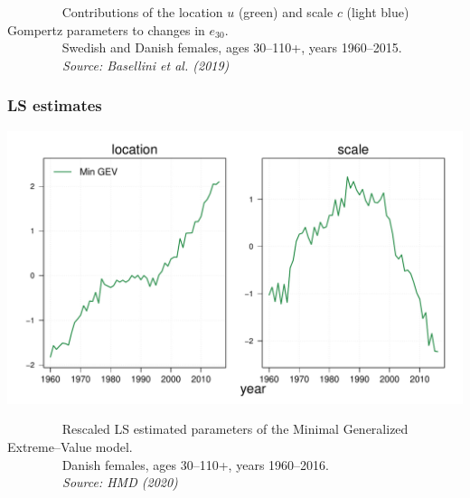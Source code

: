 \documentclass[12pt, xcolor=table]{beamer}  %
\begin{document}
\begin{frame}[noframenumbering]
\begin{center}
	\end{center}
	\vspace{-0.3cm}
	\tiny{$\quad\quad\quad\quad$ Contributions of the location $u$ (green) and scale $c$ (light blue) Gompertz
parameters to changes in $e_{30}$.\\ $\quad\quad\quad\quad$ Swedish and Danish females, ages 30--110+, years 1960--2015. \\ \emph{$\quad\quad\quad\quad$ Source: Basellini et al. (2019)}} \\
\end{frame}

\begin{frame}[noframenumbering]
\frametitle{LS estimates}
\vspace{-0.25cm}
\begin{center}
\includegraphics[scale=0.45]{Figures/Ch1/F4_a}
\end{center}
\vspace{-0.3cm}
\tiny{$\quad\quad\quad\quad$ Rescaled LS estimated parameters of the Minimal Generalized Extreme--Value model.\\ $\quad\quad\quad\quad$ Danish females, ages 30--110+, years 1960--2016. \\ \emph{$\quad\quad\quad\quad$ Source: HMD (2020)}} \\
\end{frame}
\end{document}
